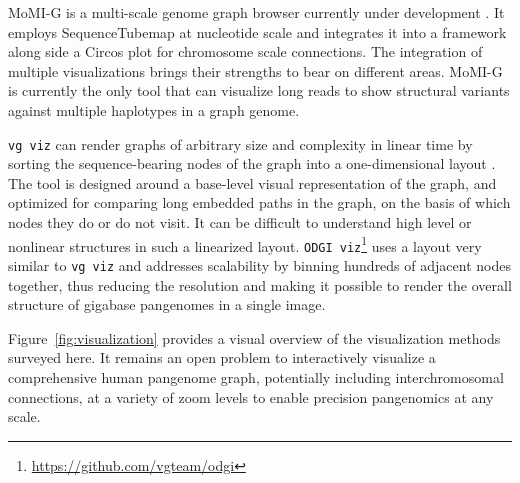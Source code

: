 
MoMI-G is a multi-scale genome graph browser currently under development \cite{yokoyama_momi-g:_2019}. It employs SequenceTubemap at nucleotide scale and integrates it into a  framework along side a Circos \cite{Krzywinski_2009_Circos} plot for chromosome scale connections. 
The integration of multiple visualizations brings their strengths to bear on different areas. 
MoMI-G is currently the only tool that can visualize long reads to show structural variants against multiple haplotypes in a graph genome.

\texttt{vg viz} can render graphs of arbitrary size and complexity in linear time by sorting the sequence-bearing nodes of the graph into a one-dimensional layout \citep{Garrison_2019}. 
The tool is designed around a base-level visual representation of the graph, and optimized for comparing long embedded paths in the graph, on the basis of which nodes they do or do not visit. 
It can be difficult to understand high level or nonlinear structures in such a linearized layout. 
\texttt{ODGI viz}\footnote{\url{https://github.com/vgteam/odgi}} uses a layout very similar to \texttt{vg viz} and addresses scalability by binning hundreds of adjacent nodes together, thus reducing the resolution and making it possible to render the overall structure of gigabase pangenomes in a single image.

Figure~\ref{fig:visualization} provides a visual overview of the visualization methods surveyed here.
It remains an open problem to interactively visualize a comprehensive human pangenome graph, potentially including interchromosomal connections, at a variety of zoom levels to enable precision pangenomics at any scale.

